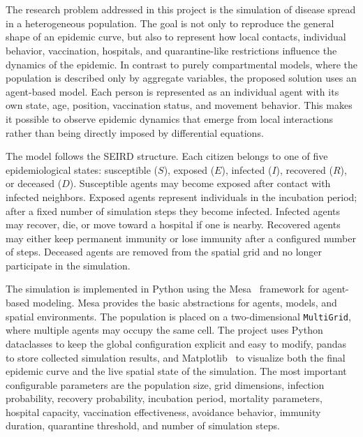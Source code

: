 \documentclass[english]{projectreport}
\begin{document}
\section{\SectionTitleProblemSolution}
\label{sec:solution}

The research problem addressed in this project is the simulation of
disease spread in a heterogeneous population. The goal is not only to
reproduce the general shape of an epidemic curve, but also to represent
how local contacts, individual behavior, vaccination, hospitals, and
quarantine-like restrictions influence the dynamics of the epidemic. In
contrast to purely compartmental models, where the population is
described only by aggregate variables, the proposed solution uses an
agent-based model. Each person is represented as an individual agent with
its own state, age, position, vaccination status, and movement behavior.
This makes it possible to observe epidemic dynamics that emerge from
local interactions rather than being directly imposed by differential
equations.

The model follows the SEIRD structure. Each citizen belongs to one of
five epidemiological states: susceptible ($S$), exposed ($E$), infected
($I$), recovered ($R$), or deceased ($D$). Susceptible agents may become
exposed after contact with infected neighbors. Exposed agents represent
individuals in the incubation period; after a fixed number of simulation
steps they become infected. Infected agents may recover, die, or move
toward a hospital if one is nearby. Recovered agents may either keep
permanent immunity or lose immunity after a configured number of steps.
Deceased agents are removed from the spatial grid and no longer
participate in the simulation.

The simulation is implemented in Python using the Mesa~\cite{mesaDocs2026}
framework for agent-based modeling. Mesa provides the basic
abstractions for agents, models, and spatial environments. The
population is placed on a
two-dimensional \texttt{MultiGrid}, where multiple agents may occupy the
same cell. The project uses Python dataclasses to keep the global
configuration explicit and easy to modify, pandas~\cite{pandasDocs2026}
to store collected simulation results, and
Matplotlib~\cite{matplotlibDocs2026} to visualize
both the final epidemic curve and the live spatial state of the
simulation. The most important configurable
parameters are the population size, grid dimensions,
infection probability, recovery probability, incubation period, mortality
parameters, hospital capacity, vaccination effectiveness, avoidance
behavior, immunity duration, quarantine threshold, and number of
simulation steps.
\end{document}

